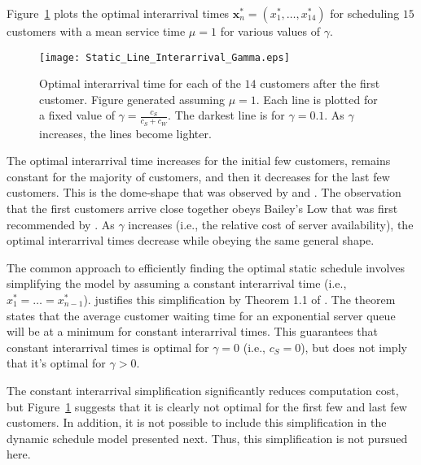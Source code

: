 Figure~\ref{fig:Static_Time_Gamma} plots the optimal interarrival times $\mathbf{x}_{n}^{*} = (x_{1}^{*}, \ldots, x_{14}^{*})$ for scheduling $15$ customers with a mean service time $\mu = 1$ for various values of $\gamma$.
\begin{figure}[htb]
	\centering
	\texttt{[image: Static\_Line\_Interarrival\_Gamma.eps]}
	\caption{Optimal interarrival time for each of the $14$ customers after the first customer. Figure generated assuming $\mu = 1$. Each line is plotted for a fixed value of $\gamma = \frac{c_{S}}{c_{S} + c_{W}}$. The darkest line is for $\gamma = 0.1$. As $\gamma$ increases, the lines become lighter.}
	\label{fig:Static_Time_Gamma}
\end{figure}

The optimal interarrival time increases for the initial few customers, remains constant for the majority of customers, and then it decreases for the last few customers. This is the dome-shape that was observed by \citet{Stein} and \citet{Mendel}. The observation that the first customers arrive close together obeys Bailey's Low that was first recommended by \citet{Bailey}. As $\gamma$ increases (i.e., the relative cost of server availability), the optimal interarrival times decrease while obeying the same general shape.

The common approach to efficiently finding the optimal static schedule involves simplifying the model by assuming a constant interarrival time (i.e., $x_{1}^{*} = \ldots = x_{n - 1}^{*}$). \citet{Stein} justifies this simplification by Theorem 1.1 of \citet{Hajek}. The theorem states that the average customer waiting time for an exponential server queue will be at a minimum for constant interarrival times. This guarantees that constant interarrival times is optimal for $\gamma = 0$ (i.e., $c_{S} = 0$), but does not imply that it's optimal for $\gamma > 0$.

The constant interarrival simplification significantly reduces computation cost, but Figure~\ref{fig:Static_Time_Gamma} suggests that it is clearly not optimal for the first few and last few customers. In addition, it is not possible to include this simplification in the dynamic schedule model presented next. Thus, this simplification is not pursued here.










































